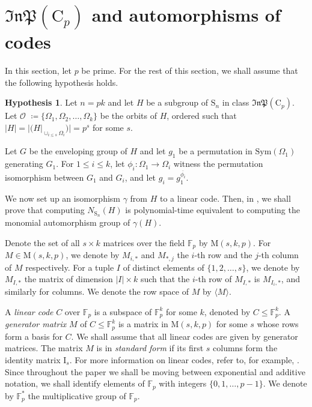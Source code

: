 \documentclass[11pt,a4paper]{article}
\theoremstyle{definition}
\newtheorem{hypothesis}[theorem]{Hypothesis}
\theoremstyle{remark}
\newcommand{\Sym}[0]{\mathrm{Sym}}
\newcommand{\InP}{\mathfrak{InP}}
\newcommand{\Sy}{\mathrm{S}}
\newcommand{\Cy}{\mathrm{C}}
\begin{document}

\section{\texorpdfstring{$\InP(\Cy_p)$}{InP(Cp)} and automorphisms of codes}
\label{section: Cpk}\label{subsection: group to code}

In this section, let $p$ be prime. 
For the rest of this section, we shall assume that the following hypothesis holds.

\begin{hypothesis}\label{defining H as subdir of  Cpk} \label{cpk hypo}
Let $n=pk$ and let $H$ be a subgroup of $\Sy_n$ in class $\mathfrak{InP}(\Cy_p)$. 
Let $\mathcal{O}$ $\coloneqq \{\Omega_1, \Omega_2, \ldots, \Omega_k \}$ be the orbits of $H$, ordered such that $|H| = |(H|_{\cup_{i \leq s}\Omega_i})| =  p^s$ for some $s$. 

Let $G$ be the enveloping group of $H$ and let $g_1$ be a permutation in $\Sym(\Omega_1)$ generating $G_1$. For $1 \leq i \leq k$, let $\phi_i: \Omega_1 \rightarrow \Omega_i$ witness the permutation isomorphism between $G_1$ and $G_i$, and let $g_i = g_1^{\overline{\phi_i}}$. 
\end{hypothesis}


We now set up an isomorphism $\gamma$ from $H$ to a linear code. Then, in , we shall prove that computing $N_{\Sy_n}(H)$ is polynomial-time equivalent to computing the monomial automorphism group of $\gamma(H)$.



Denote the set of all $s \times k$ matrices over the field $\mathds{F}_p$ by $\mathrm{M}(s,k,p)$. 
For $M \in \mathrm{M}(s,k,p)$, we denote by $M_{i,*}$ and $M_{*,j}$ the $i$-th row and the $j$-th column of $M$ respectively. 
For a tuple $I$ of distinct elements of $\{1,2, \ldots, s\}$, we denote by $M_{I,*}$ the matrix of dimension $|I| \times k$ such that the $i$-th row of $M_{I,*}$ is $M_{I_i,*}$, and similarly for columns. 
We denote the row space of $M$ by $\langle M \rangle$. 


A \emph{linear code} $C$ over $\mathds{F}_p$ is a subspace of $\mathds{F}_p^k$ for some $k$, denoted by $C \leq \mathds{F}_p^k$. 
A \emph{generator matrix} $M$ of $C\leq \mathds{F}_p^k$ is a matrix in $\mathrm{M}(s,k, p)$ for some $s$ whose rows form a basis for $C$. 
We shall assume that all linear codes are given by generator matrices.
The matrix $M$ is in \emph{standard form} if its first $s$ columns form the identity matrix $\mathrm{I}_s$. 
For more information on linear codes, refer to, for example, \cite{lintCoding}. 
Since throughout the paper we shall be moving between exponential and additive notation, we shall identify elements of $\mathds{F}_p$ with integers $\{0,1, \ldots, p-1 \}$. 
We denote by $\mathds{F}_p^*$ the multiplicative group of $\mathds{F}_p$. 
\end{document}
